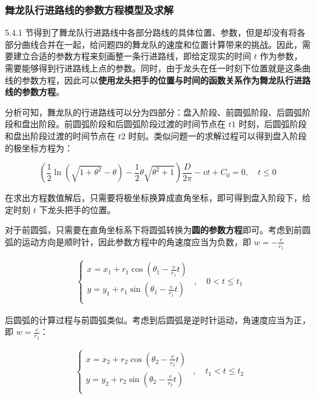 \documentclass[a4paper]{article}
\begin{document}
	\subsubsection{舞龙队行进路线的参数方程模型及求解}
	
		5.4.1 节得到了舞龙队行进路线中各部分路线的具体位置、参数，但是却没有将各部分曲线合并在一起，给问题四的舞龙队的速度和位置计算带来的挑战。因此，需要建立合适的参数方程来刻画整一条行进路线，即给定现实的时间 $t$ 作为参数，需要能够得到行进路线上点的参数。同时，由于龙头在任一时刻下位置就是这条曲线的参数方程，因此可以\textbf{使用龙头把手的位置与时间的函数关系作为舞龙队行进路线的参数方程}。
		
		分析可知，舞龙队的行进路线可以分为四部分：盘入阶段、前圆弧阶段、后圆弧阶段和盘出阶段。前圆弧阶段和后圆弧阶段过渡的时间节点在 $t1$ 时刻，后圆弧阶段和盘出阶段过渡的时间节点在 $t2$ 时刻。类似问题一的求解过程可以得到盘入阶段的极坐标方程为：
		
		\begin{equation}
			(\frac{1}{2}\ln(\sqrt{1 + \theta^2} - \theta) - \frac{1}{2} \theta \sqrt{\theta^2 + 1}) \frac{D}{2 \pi} - vt + C_0 = 0, \quad t \le 0
		\end{equation}
		
		在求出方程数值解后，只需要将极坐标换算成直角坐标，即可得到盘入阶段下，给定时刻 $t$ 下龙头把手的位置。
		
		对于前圆弧，只需要在直角坐标系下将圆弧转换为\textbf{圆的参数方程}即可。考虑到前圆弧的运动方向是顺时针，因此参数方程中的角速度应当为负数，即 $w = -\frac{v}{r_1}$ 
		
		\begin{equation}
			\begin{aligned}
				\left\{
					\begin{array}{l}
						x = x_1 + r_1 \cos(\theta_1 - \frac{v}{r_1}t) \\
						y = y_1 + r_1 \sin(\theta_1 - \frac{v}{r_1}t) \\
					\end{array}
				\right.
			\end{aligned}
			, \quad 0 < t \le t_1
		\end{equation}
		
		后圆弧的计算过程与前圆弧类似。考虑到后圆弧是逆时针运动，角速度应当为正，即 $w = \frac{v}{r_2} $：
		
		\begin{equation}
			\begin{aligned}
				\left\{
				\begin{array}{l}
					x = x_2 + r_2 \cos(\theta_2 - \frac{v}{r_2}t) \\
					y = y_2 + r_2 \sin(\theta_2 - \frac{v}{r_2}t) \\
				\end{array}
				\right.
			\end{aligned}
			, \quad t_1 < t \le t_2
		\end{equation}
		
\end{document}

